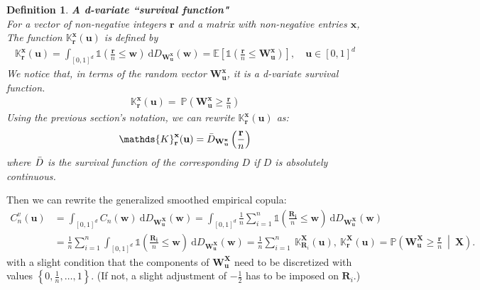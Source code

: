 \documentclass[12pt]{report}
\newtheorem{definition}{Definition}[subsection]
\newcommand{\1}{\mathbf{1}}
\begin{document}
\begin{flushleft}
\begin{definition}\label{K function}
\textit{\normalfont\parencite{KojadinovicYi2024Smooth}}\:
\textbf{A d-variate ``survival function"} \\
For a vector of non-negative integers $\boldsymbol{r}$ and a matrix with non-negative entries $\boldsymbol{x}$, The function $\mathds{K}_{\boldsymbol{r}}^{\boldsymbol{x}}(\boldsymbol{u})$ is defined by
\begin{align*}
\mathds{K}_{\boldsymbol{r}}^{\boldsymbol{x}}(\boldsymbol{u}) = \int_{[0,1]^d} \mathds{1}\left(\frac{\boldsymbol{r}}{n} \le \boldsymbol{w}\right) \: \mathrm{d}D_{\boldsymbol{W}_{\boldsymbol{u}}^{\boldsymbol{x}}}(\boldsymbol{w}) = \mathbb{E} \left[ \mathds{1}(\frac{\boldsymbol{r}}{n} \le \boldsymbol{W}^{\boldsymbol{x}}_{\boldsymbol{u}}) \right], \quad \boldsymbol{u} \in [0,1]^{d}
\end{align*}
We notice that, in terms of the random vector $\boldsymbol{W}^{\boldsymbol{x}}_{\boldsymbol{u}}$, it is a d-variate survival function.
\begin{align*}
\mathds{K}_{\boldsymbol{r}}^{\boldsymbol{x}}(\boldsymbol{u}) = \
\mathbb{P} \left( \boldsymbol{W}^{\boldsymbol{x}}_{\boldsymbol{u}} \ge \frac{\boldsymbol{r}}{n} \right)
\end{align*}
Using the previous section's notation, we can rewrite $\mathds{K}_{\textbf{r}}^{\textbf{x}}(\textbf{u})$ as:
\begin{align*}
\mathds{K}_{\textbf{r}}^{\textbf{x}}(\textbf{u}) = \Bar{D}_{\textbf{W}^{\textbf{x}}_{\textbf{u}}}\left(\frac{\textbf{r}}{n}\right)
\end{align*}
where $\Bar{D}$ is the survival function of the corresponding $D$ if $D$ is absolutely continuous.
\end{definition}
Then we can rewrite the generalized smoothed empirical copula:
\begin{align*}
C_{n}^{v}(\textbf{u}) &= \int_{[0,1]^d} C_{n}(\boldsymbol{w}) \: \mathrm{d}D_{\boldsymbol{W}_{\boldsymbol{u}}^{\boldsymbol{X}}}(\boldsymbol{w})
= \int_{[0,1]^d} \frac{1}{n} \sum\limits_{i = 1}^{n} \mathds{1}\left(\frac{\boldsymbol{R_{i}}}{n} \le \boldsymbol{w}\right) \: \mathrm{d}D_{\boldsymbol{W}_{\boldsymbol{u}}^{\boldsymbol{X}}}(\boldsymbol{w}) \\
&= \frac{1}{n} \sum\limits_{i = 1}^{n} \int_{[0,1]^d}  \mathds{1}\left(\frac{\boldsymbol{R_{i}}}{n} \le \boldsymbol{w}\right) \: \mathrm{d}D_{\boldsymbol{W}_{\boldsymbol{u}}^{\boldsymbol{X}}}(\boldsymbol{w}) 
= \frac{1}{n} \sum\limits_{i = 1}^{n} \: \mathds{K}_{\boldsymbol{R}_{i}}^{\boldsymbol{X}}(\boldsymbol{u}), \:
\mathds{K}_{\boldsymbol{r}}^{\boldsymbol{X}}(\boldsymbol{u}) = \mathbb{P} \left( \boldsymbol{W}^{\boldsymbol{X}}_{\boldsymbol{u}} \ge \frac{\boldsymbol{r}}{n} \: \middle| \: \boldsymbol{X} \right).
\end{align*}
with a slight condition that the components of $\boldsymbol{W}^{\boldsymbol{X}}_{\boldsymbol{u}}$ need to be discretized \parencite{KojadinovicYi2024Smooth} with values $\left\{0,\frac{1}{n}, \dots, 1 \right\}$. (If not, a slight adjustment of $-\frac{1}{2}$ has to be imposed on $\boldsymbol{R}_{i}$.)


\end{flushleft}
\end{document}
